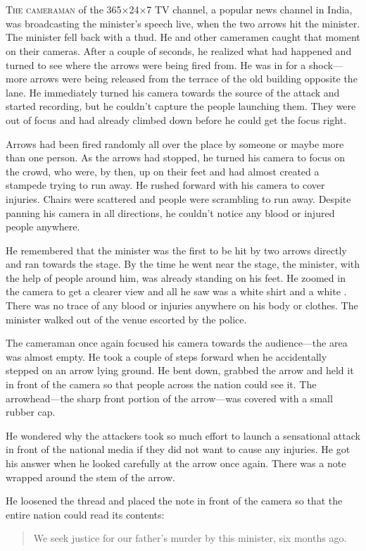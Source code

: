 \chapter{}

\lettrine{T}{he cameraman} of the 365×24×7 TV channel, a popular news channel in
India, was broadcasting the minister's speech live, when
the two arrows hit the minister. The minister fell back with a thud. He and
other cameramen caught that moment on their cameras. After a couple of seconds,
he realized what had happened and turned to see where the arrows were being fired
from.  He was in for a shock—more arrows were being released from the terrace of
the old building opposite the lane. He immediately turned his camera towards the
source of the attack and started recording, but he couldn't capture the people
launching them. They were out of focus and had already climbed down before he
could get the focus right.

Arrows had been fired randomly all over the place by someone or maybe more than one
person. As the arrows had stopped, he turned his camera to focus on the crowd, who
were, by then, up on their feet and had almost created a stampede trying to run
away. He rushed forward with his camera to cover injuries. Chairs were scattered
and people were scrambling to run away. Despite panning his camera in all
directions, he couldn't notice any blood or injured people anywhere.

He remembered that the minister was the first to be hit by two arrows directly
and ran towards the stage. By the time he went near the stage, the minister,
with the help of people around him, was already standing on his feet. He zoomed
in the camera to get a clearer view and all he saw was a white shirt and a white
. There was no trace of any blood or injuries anywhere on his
body or clothes. The minister walked out of the venue escorted by the police.

The cameraman once again focused his camera towards the audience—the area was
almost empty. He took a couple of steps forward when he accidentally stepped on
an arrow lying ground. He bent down, grabbed the arrow and held it in
front of the camera so that people across the nation could see it. The
arrowhead—the sharp front portion of the arrow—was covered with a small rubber
cap.

He wondered why the attackers took so much effort to launch a sensational attack
in front of the national media if they did not want to cause any injuries. He
got his answer when he looked carefully at the arrow once again. There was a
note wrapped around the stem of the arrow.

He loosened the thread and placed the note in front of the camera so that the
entire nation could read its contents:
\begin{quote}
    We seek justice for our father's murder by this minister, six months ago.
\end{quote}